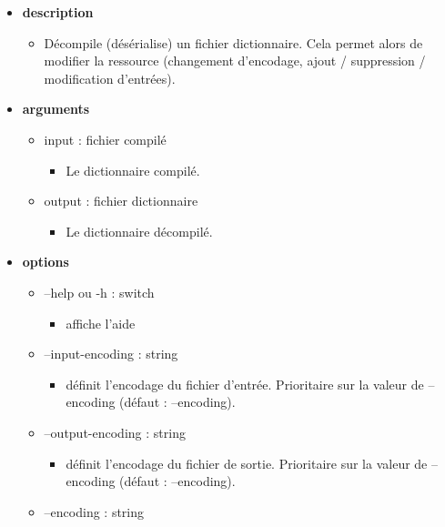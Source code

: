 \documentclass[manual-fr.tex]{subfiles}
\begin{document}
\begin{itemize}
    \item[] \textbf{description}
        \begin{itemize}
            \item[] Décompile (désérialise) un fichier dictionnaire. Cela permet alors de modifier la ressource (changement d'encodage, ajout / suppression / modification d'entrées).
        \end{itemize}
    \item[] \textbf{arguments}
        \begin{itemize}
            \item[] input : fichier compilé
                \begin{itemize}
                    \item[] Le dictionnaire compilé.
                \end{itemize}
            \item[] output : fichier dictionnaire
                \begin{itemize}
                    \item[] Le dictionnaire décompilé.
                \end{itemize}
        \end{itemize}
    \item[] \textbf{options}
        \begin{itemize}
            \item[] --help ou -h : switch
                \begin{itemize}
                    \item[] affiche l'aide
                \end{itemize}
            \item[] --input-encoding : string
                \begin{itemize}
                    \item[] définit l'encodage du fichier d'entrée. Prioritaire sur la valeur de --encoding (défaut : --encoding).
                \end{itemize}
            \item[] --output-encoding : string
                \begin{itemize}
                    \item[] définit l'encodage du fichier de sortie. Prioritaire sur la valeur de --encoding (défaut : --encoding).
                \end{itemize}
            \item[] --encoding : string

\end{itemize}
\end{itemize}
\end{document}
